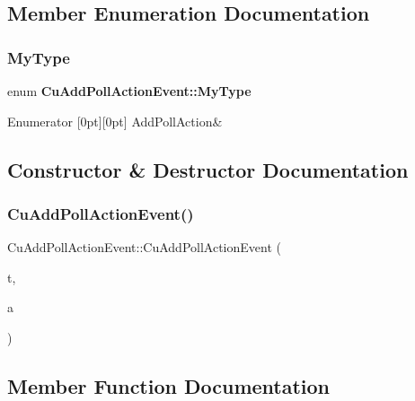 \subsection{Member Enumeration Documentation}
\mbox{\label{classCuAddPollActionEvent_a424f4b10545167198789e36b7e8b9c15}} 
\subsubsection{MyType}
{\footnotesize\ttfamily enum \textbf{ Cu\+Add\+Poll\+Action\+Event\+::\+My\+Type}}

\begin{DoxyEnumFields}{Enumerator}
[0pt][0pt]{}\mbox{\label{classCuAddPollActionEvent_a424f4b10545167198789e36b7e8b9c15ac119130fb6ec20e39f7831a0c2cbac1c}} 
Add\+Poll\+Action&\\
\hline

\end{DoxyEnumFields}


\subsection{Constructor \& Destructor Documentation}
\mbox{\label{classCuAddPollActionEvent_aec6d7fa2368748aa40f3672f5cd4474e}} 
\subsubsection{CuAddPollActionEvent()}
{\footnotesize\ttfamily Cu\+Add\+Poll\+Action\+Event\+::\+Cu\+Add\+Poll\+Action\+Event (\begin{DoxyParamCaption}\item[{const \textbf{ R\+N\+D\+Source} \&}]{t,  }\item[{\textbf{ Cu\+R\+N\+D\+ActionI} $\ast$}]{a }\end{DoxyParamCaption})}



\subsection{Member Function Documentation}
\mbox{\label{classCuAddPollActionEvent_a6bf6448cd5ce157ed7fe548437636312}} 
